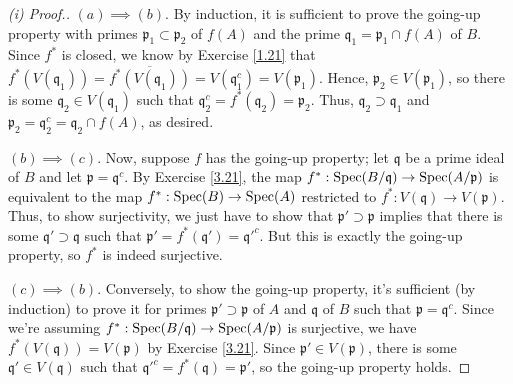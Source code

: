 \begin{proof}[(i) Proof.]
$(a) \implies (b)$. By induction, it is sufficient to prove the going-up property with primes $\mathfrak{p}_1 \subset \mathfrak{p}_2$ of $f(A)$
and the prime $\mathfrak{q}_1 = \mathfrak{p}_1 \cap f(A)$ of $B$. Since $f^*$ is closed, we know by Exercise \ref{1.21} that $f^*(V(\mathfrak{q}_1)) 
= \overline{f^*(V(\mathfrak{q}_1))} = V(\mathfrak{q}_1^c) = V(\mathfrak{p}_1)$. Hence, $\mathfrak{p}_2 \in V(\mathfrak{p}_1)$, so there is some
$\mathfrak{q}_2 \in V(\mathfrak{q}_1)$ such that $\mathfrak{q}_2^c = f^*(\mathfrak{q}_2) = \mathfrak{p}_2$. Thus, $\mathfrak{q}_2 \supset \mathfrak{q}_1$ 
and $\mathfrak{p}_2 = \mathfrak{q}_2^c = \mathfrak{q}_2 \cap f(A)$, as desired.

$(b) \implies (c)$. Now, suppose $f$ has the going-up property; let $\mathfrak{q}$ be a prime ideal of $B$ and let $\mathfrak{p} = \mathfrak{q}^c$. By 
Exercise \ref{3.21}, the map $f^* : \operatorname{Spec}(B/\mathfrak{q}) \to \operatorname{Spec}(A/\mathfrak{p})$ is equivalent to the map $f^* : \operatorname{Spec}(B) \to \operatorname{Spec}(A)$ restricted to
$f^* : V(\mathfrak{q}) \to V(\mathfrak{p})$. Thus, to show surjectivity, we just have to show that $\mathfrak{p}' \supset \mathfrak{p}$ implies that
there is some $\mathfrak{q}' \supset \mathfrak{q}$ such that $\mathfrak{p}' = f^*(\mathfrak{q}') = \mathfrak{q}'^c$. But this is exactly the
going-up property, so $f^*$ is indeed surjective.

$(c) \implies (b)$. Conversely, to show the going-up property, it's sufficient (by induction) to prove it for primes $\mathfrak{p}' \supset \mathfrak{p}$
of $A$ and $\mathfrak{q}$ of $B$ such that $\mathfrak{p} = \mathfrak{q}^c$. Since we're assuming $f^* : \operatorname{Spec}(B/\mathfrak{q}) \to \operatorname{Spec}(A/\mathfrak{p})$
is surjective, we have $f^*(V(\mathfrak{q})) = V(\mathfrak{p})$ by Exercise \ref{3.21}. Since $\mathfrak{p}' \in V(\mathfrak{p})$, there is some 
$\mathfrak{q}' \in V(\mathfrak{q})$ such that $\mathfrak{q}'^c = f^*(\mathfrak{q}) = \mathfrak{p}'$, so the going-up property holds.
\end{proof}

